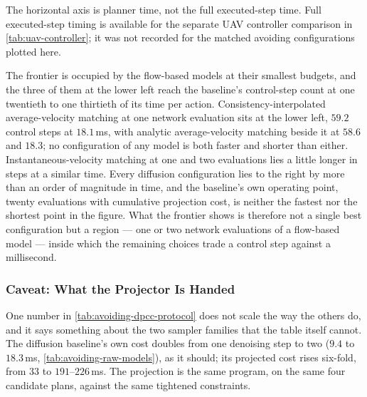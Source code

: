 The horizontal axis is planner time, not the full executed-step time. Full executed-step timing is
available for the separate UAV controller comparison in \autoref{tab:uav-controller}; it was not
recorded for the matched avoiding configurations plotted here.

The frontier is occupied by the flow-based models at their smallest budgets, and the three of them at
the lower left reach the baseline's control-step count at one twentieth to one thirtieth of its time per
action. Consistency-interpolated average-velocity matching at one network evaluation sits at the lower
left, $59.2$ control steps at $18.1$\,ms, with analytic average-velocity matching beside it at $58.6$
and $18.3$; no configuration of any model is both faster and shorter than either.
Instantaneous-velocity matching at one and two evaluations lies a little longer in steps at a similar
time. Every diffusion configuration lies to the right by more than an order of magnitude in time, and
the baseline's own operating point, twenty evaluations with cumulative projection cost, is neither the
fastest nor the shortest point in the figure.
What the frontier shows is therefore not a single best configuration but a region --- one or two network
evaluations of a flow-based model --- inside which the remaining choices trade a control step against a
millisecond.

\subsubsection{Caveat: What the Projector Is Handed}\label{sec:res:avoiding:caveat:noise}

One number in \autoref{tab:avoiding-dpcc-protocol} does not scale the way the others do, and it says
something about the two sampler families that the table itself cannot. The diffusion baseline's own cost
doubles from one denoising step to two ($9.4$ to $18.3$\,ms, \autoref{tab:avoiding-raw-models}), as it
should; its projected cost rises six-fold, from $33$ to $191$--$226$\,ms. The projection is the same
program, on the same four candidate plans, against the same tightened constraints.

